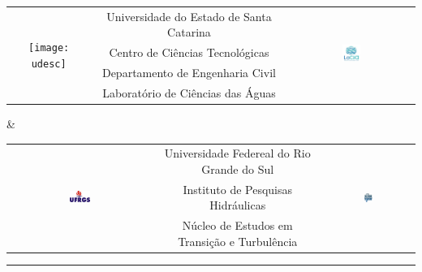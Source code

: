 \documentclass[12pt, a4paper]{article}
\begin{document}
\begin{titlepage}

\begin{table}[htp]
\centering
\begin{tabular}{ccc}
\multirow{4}{*}{\texttt{[image: udesc]}} & Universidade do Estado de Santa Catarina & \multirow{4}{*}{\includegraphics[width=0.15\textwidth]{lacia}} \\
                  & Centro de Ciências Tecnológicas & \\
                  & Departamento de Engenharia Civil & \\
                  & Laboratório de Ciências das Águas &                  
\end{tabular}
\end{table}

\centering \& \\[.5 cm]  

\begin{table}[htp]
\centering
\begin{tabular}{ccc}
\multirow{3}{*}{\includegraphics[width=0.15\textwidth]{ufrgs}} & Universidade Federeal do Rio Grande do Sul & \multirow{3}{*}{\includegraphics[width=0.10\textwidth]{iph}} \\
                  & Instituto de Pesquisas Hidráulicas & \\
                  & Núcleo de Estudos em Transição e Turbulência & \\               
\end{tabular}
\end{table}

\vspace{3cm}

\begin{flushleft}
	
\noindent\rule{\linewidth}{0.2 mm} \\[1 cm]
	

\end{flushleft}
\end{titlepage}
\end{document}
